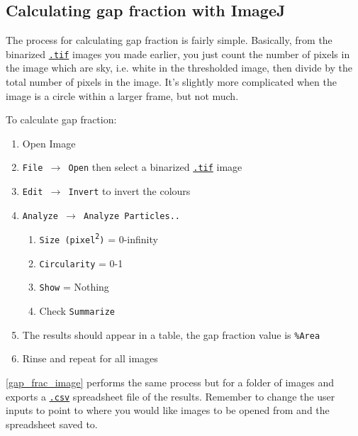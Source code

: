 \documentclass{article}
\newcommand\menu[1]{\texttt{\color{blue}#1}}
\newcommand\file[1]{\texttt{\underline{#1}}}
\begin{document}
\subsection{Calculating gap fraction with ImageJ}

The process for calculating gap fraction is fairly simple. Basically, from the binarized \file{.tif} images you made earlier, you just count the number of pixels in the image which are sky, i.e. white in the thresholded image, then divide by the total number of pixels in the image. It's slightly more complicated when the image is a circle within a larger frame, but not much.

To calculate gap fraction: 

\begin{enumerate}
	\item{Open Image}
	\item{\menu{File $\rightarrow$ Open} then select a binarized \file{.tif} image} 
	\item{\menu{Edit $\rightarrow$ Invert} to invert the colours}
	\item{\menu{Analyze $\rightarrow$ Analyze Particles..}}
		\begin{enumerate}
			\item{\menu{Size (pixel\textsuperscript{2})} = 0-infinity}
			\item{\menu{Circularity} = 0-1}
			\item{\menu{Show} = Nothing}
			\item{Check \menu{Summarize}}
		\end{enumerate}
	\item{The results should appear in a table, the gap fraction value is \menu{\%Area}}
	\item{Rinse and repeat for all images}
\end{enumerate}

\autoref{gap_frac_image} performs the same process but for a folder of images and exports a \file{.csv} spreadsheet file of the results. Remember to change the user inputs to point to where you would like images to be opened from and the spreadsheet saved to.
\end{document}
